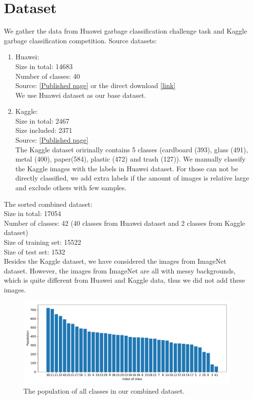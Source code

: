 \section{Dataset}
We gather the data from Huawei garbage classification challenge task and Kaggle garbage classification competition.
Source datasets:
\begin{enumerate}
    \item Huawei: \\
          Size in total: 14683\\
          Number of classes: 40\\
          Source: \href{https://developer.huaweicloud.com/hero/forum.php?mod=viewthread&tid=24106}{[Published page]}
          or the direct download \href{https://modelarts-competitions.obs.cn-north-1.myhuaweicloud.com/garbage_classify/dataset/garbage_classify_v2.zip}{[link]} \\
          We use Huawei dataset as our base dataset.
    \item Kaggle: \\
          Size in total: 2467\\
          Size included: 2371\\
          Source: \href{https://www.kaggle.com/asdasdasasdas/garbage-classification}{[Published page]}\\
          The Kaggle dataset oririnally contains 5 classes (cardboard (393), glass (491), metal (400), paper(584), plastic (472) and trash (127)). 
          We manually classify the Kaggle images with the labels in Huawei dataset. For those can not be directly classified, 
          we add extra labels if the amount of images is relative large and exclude others with few samples.
\end{enumerate}
%
The sorted combined dataset:\\
Size in total: 17054\\
Number of classes: 42 (40 classes from Huawei dataset and 2 classes from Kaggle dataset)\\
Size of training set: 15522\\
Size of test set: 1532\\
Besides the Kaggle dataset, we have considered the images from ImageNet dataset. However, the images from ImageNet are all with 
messy backgrounds, which is quite different from Huawei and Kaggle data, thus we did not add these images.
\begin{figure}[ht]
    \centering
    \includegraphics[width=\linewidth]{figs/dist_dataset.pdf}
    \caption{The population of all classes in our combined dataset.}
\end{figure}
